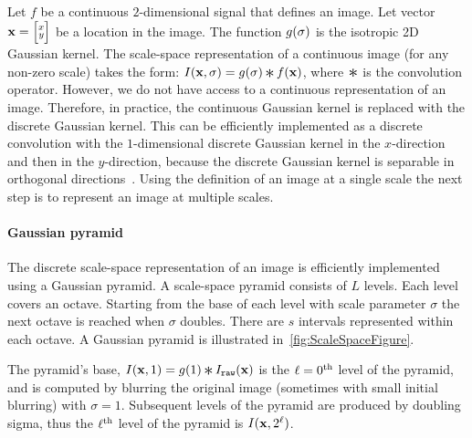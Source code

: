         Let $f$ be a continuous $2$-dimensional signal that defines an image. Let vector $\mathbf{x}= \Bigl[\negthinspace \begin{smallmatrix}  x\\ y \end{smallmatrix} \negthinspace \Bigr] $ be a
        location in the image. The function $g(\sigma)$
        is the isotropic 2D Gaussian kernel. The scale-space representation of a continuous image (for any non-zero
        scale) takes the form: $\img(\pt, \scale) = g(\scale) \conv f(\pt)$, where $\conv$ is the convolution
        operator. However, we do not have access to a continuous representation of an image. Therefore, in
        practice, the continuous Gaussian kernel is replaced with the discrete Gaussian kernel. This can be
        efficiently implemented as a discrete convolution with the $1$-dimensional discrete Gaussian kernel in the
        $x$-direction and then in the $y$-direction, because the discrete Gaussian kernel is separable in
        orthogonal directions~\cite{lindeberg_scale_space_1993}. Using the definition of an image at a single scale
        the next step is to represent an image at multiple scales.

       \paragraph{Gaussian pyramid}

           \newcommand{\downsamp}[2]{#1[::\tightpad#2,::\tightpad#2]}
            The discrete scale-space representation of an image is efficiently implemented using a Gaussian
            pyramid. A scale-space pyramid consists of $L$ levels. Each level covers an octave. Starting from the
            base of each level with scale parameter $\sigma$ the next octave is reached when $\sigma$ doubles.
            There are $s$ intervals represented within each octave. A Gaussian pyramid is illustrated
            in~\cref{fig:ScaleSpaceFigure}.

            \ScaleSpaceFigure{}

            The pyramid's base, %
            $\img(\pt, 1) = g( 1 ) \conv \rawimg(\pt)$ %
            is the $\ell=0^{\textrm{th}}{}$ level of the pyramid, and is computed by blurring the original image (sometimes
            with small initial blurring) with $\sigma=1$. Subsequent levels of the pyramid are produced by doubling
            sigma, thus the $\ell^{\textrm{th}}{}$ level of the pyramid is $I(\mathbf{x}, 2^\ell)$.

